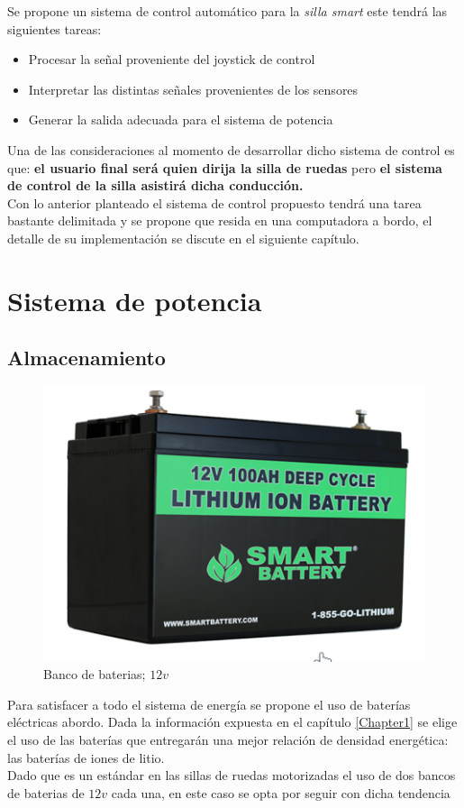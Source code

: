 Se propone un sistema de control autom\'atico para la \emph{silla smart} este
tendr\'a las siguientes tareas:
\begin{itemize}
    \item Procesar la se\~nal proveniente del joystick de control
    \item Interpretar las distintas se\~nales provenientes de los sensores
    \item Generar la salida adecuada para el sistema de potencia
\end{itemize}

Una de las consideraciones al momento de desarrollar dicho sistema de control es
que: \textbf{el usuario final ser\'a quien dirija la silla de ruedas} pero \textbf{el
sistema de control de la silla asistir\'a dicha conducci\'on.}\\

Con lo anterior planteado el sistema de control propuesto tendr\'a una tarea
bastante delimitada y se propone que resida en una computadora a bordo, el
detalle de su implementaci\'on se discute en el siguiente cap\'itulo.


\section{Sistema de potencia}

\subsection{Almacenamiento}

\begin{figure}[th]
    \centering
    \includegraphics[width=.4\textwidth]{Figures/batery.png}
    \decoRule
    \caption{Banco de baterias; $12v$}
    \label{fig:batery}
\end{figure}

Para satisfacer a todo el sistema de energ\'ia se propone el uso de bater\'ias
el\'ectricas abordo. Dada la informaci\'on expuesta en el cap\'itulo
\ref{Chapter1} se elige el uso de las bater\'ias que entregar\'an una mejor
relaci\'on de densidad energ\'etica: las bater\'ias de iones de litio.\\
Dado que es un est\'andar en las sillas de ruedas motorizadas el uso de dos
bancos de baterias de $12v$ cada una, en este caso se opta por seguir con dicha
tendencia

